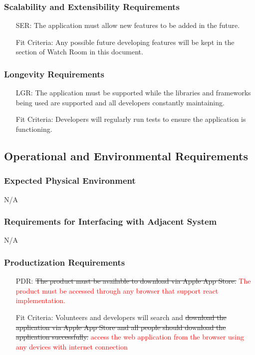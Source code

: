 \documentclass[12pt]{article}
\newcounter{reqnum} %
\newcounter{serreqnum} %
\newcounter{lgrreqnum} %
\newcounter{pdrreqnum} %
\begin{document}
\subsubsection{Scalability and Extensibility Requirements}
\begin{itemize}
    \item[SER\refstepcounter{serreqnum}\theserreqnum \label{R_Inputs}:] The application must allow new features to be added in the future.
    \item[] Fit Criteria: Any possible future developing features will be kept in the section of Watch Room in this document.
\end{itemize}

\subsubsection{Longevity Requirements}
\begin{itemize}
    \item[LGR\refstepcounter{lgrreqnum}\thelgrreqnum \label{R_Inputs}:] The application must be supported while the libraries and frameworks being used are supported and all developers constantly maintaining.
    \item[] Fit Criteria: Developers will regularly run tests to ensure the application is functioning.
\end{itemize}

\subsection{Operational and Environmental Requirements}
\subsubsection{Expected Physical Environment}
N/A

\subsubsection{Requirements for Interfacing with Adjacent System}
N/A

\subsubsection{Productization Requirements}
\begin{itemize}
    \item[PDR\refstepcounter{pdrreqnum}\thepdrreqnum \label{R_Inputs}:] \sout{The product must be available to download via Apple App Store.} \textcolor{red}{The product must be accessed through any browser that support react implementation.}
    \item[] Fit Criteria: Volunteers and developers will search and \sout{download the application via Apple App Store and all people should download the application successfully.} \textcolor{red}{access the web application from the browser using any devices with internet connection}
\end{itemize}
\end{document}
